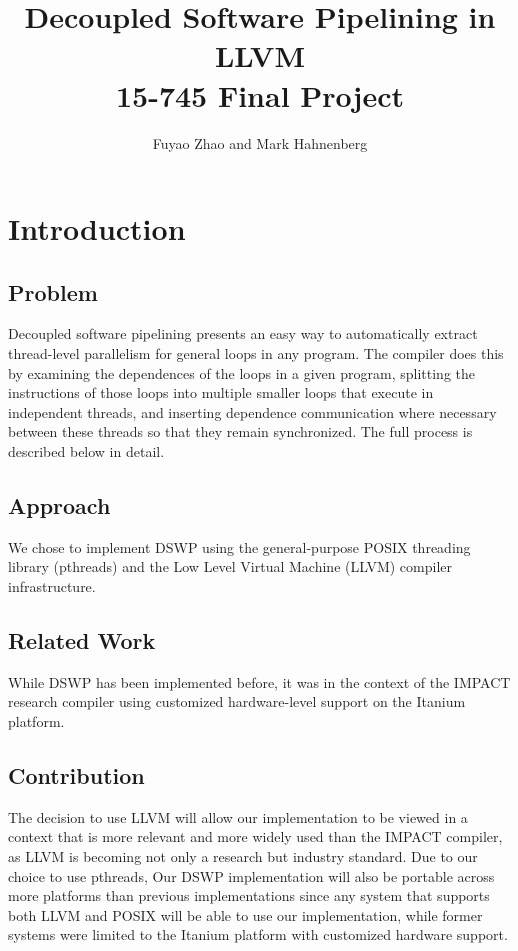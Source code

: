 \documentclass[11pt]{article}
\title{Decoupled Software Pipelining in LLVM \\
        {\large 15-745 Final Project}}
\author{Fuyao Zhao and Mark Hahnenberg}
\date{}
\begin{document}
\maketitle

\section{Introduction}
\subsection{Problem}
Decoupled software pipelining presents an easy way to automatically extract thread-level parallelism for general loops in any program.  The compiler does this by examining the dependences of the loops in a given program, splitting the instructions of those loops into multiple smaller loops that execute in independent threads, and inserting dependence communication where necessary between these threads so that they remain synchronized.  The full process is described below in detail.  

\subsection{Approach}
We chose to implement DSWP using the general-purpose POSIX threading library (pthreads) and the Low Level Virtual Machine (LLVM) compiler infrastructure.  

\subsection{Related Work}
While DSWP has been implemented before, it was in the context of the IMPACT research compiler using customized hardware-level support on the Itanium platform.

\subsection{Contribution}
The decision to use LLVM will allow our implementation to be viewed in a context that is more relevant and more widely used than the IMPACT compiler, as LLVM is becoming not only a research but industry standard.  Due to our choice to use pthreads, Our DSWP implementation will also be portable across more platforms than previous implementations since any system that supports both LLVM and POSIX will be able to use our implementation, while former systems were limited to the Itanium platform with customized hardware support.
\end{document}

